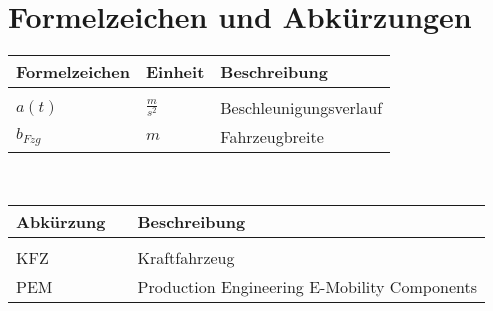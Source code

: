 \section{Formelzeichen und Abkürzungen}
\hspace{0.7cm}
\begin{tabularx}{15.1cm}{llX}
	\textbf{Formelzeichen} & \textbf{Einheit} & \textbf{Beschreibung} \\
	\hline \\ [-0.2cm]
	$a(t)$ & $\frac{m}{s^2}$ & Beschleunigungsverlauf \\ [0.1cm]
	$b_{Fzg}$ & $m$ & Fahrzeugbreite \\ [0.1cm]
\end{tabularx}
\vspace{1cm}
\\
\hspace*{0.8cm}
\begin{tabularx}{15.1cm}{lll}
	\textbf{Abkürzung} & \hspace{1.95cm} & \textbf{Beschreibung} \\ %
	\hline \\ [-0.2cm]
	KFZ & & Kraftfahrzeug \\ [0.1cm]
	PEM & & Production Engineering E-Mobility Components \\ [0.1cm]
\end{tabularx}




